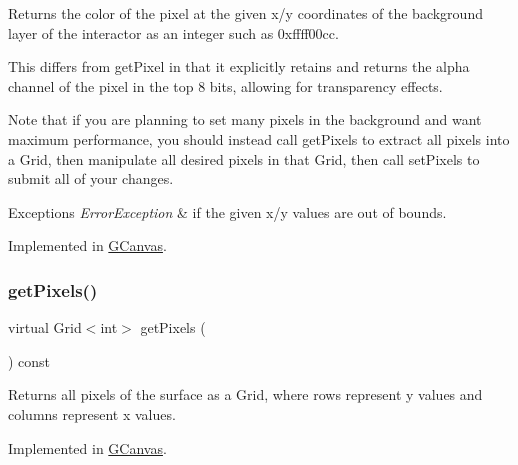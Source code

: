 Returns the color of the pixel at the given x/y coordinates of the background layer of the interactor as an integer such as 0xffff00cc. 

This differs from get\+Pixel in that it explicitly retains and returns the alpha channel of the pixel in the top 8 bits, allowing for transparency effects.

Note that if you are planning to set many pixels in the background and want maximum performance, you should instead call get\+Pixels to extract all pixels into a Grid, then manipulate all desired pixels in that Grid, then call set\+Pixels to submit all of your changes.


\begin{DoxyExceptions}{Exceptions}
{\em Error\+Exception} & if the given x/y values are out of bounds. \\
\hline
\end{DoxyExceptions}


Implemented in \mbox{\hyperlink{classGCanvas_ae28117ec01d58208d381fba886030850}{G\+Canvas}}.

\mbox{\label{classGDrawingSurface_a9811240b1241922153dec17d395797cf}} 
\subsubsection{\texorpdfstring{get\+Pixels()}{getPixels()}}
{\footnotesize\ttfamily virtual Grid$<$int$>$ get\+Pixels (\begin{DoxyParamCaption}{ }\end{DoxyParamCaption}) const\hspace{0.3cm}{\ttfamily [pure virtual]}}



Returns all pixels of the surface as a Grid, where rows represent y values and columns represent x values. 



Implemented in \mbox{\hyperlink{classGCanvas_aec81bf7947e993d8df8039e19dbac533}{G\+Canvas}}.

\mbox{\label{classGDrawingSurface_a5712954f3edce2e1e4dd3109ffe16e05}} 
